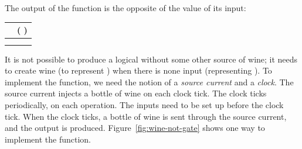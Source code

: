 \begin{schemeregion}
 The output of the  function is the opposite of the value of its input:
\begin{center}
	\begin{tabular}{c|c} %
		\var{A} & (\function{not} \var{A}) \\ \hline
		\false & \true \\
		\true & \false \\ %
	\end{tabular}
\end{center}

It is not possible to produce a logical  without some other source of wine; it needs to create wine (to represent \true) when there is none input (representing \false).  To implement the  function, we need the notion of a {\em source current} and a {\em clock}.  The source current injects a bottle of wine on each clock tick.  The clock ticks periodically, on each operation.  The inputs need to be set up before the clock tick.  When the clock ticks, a bottle of wine is sent through the source current, and the output is produced.  Figure~\ref{fig:wine-not-gate} shows one way to implement the  function.


\end{schemeregion}
